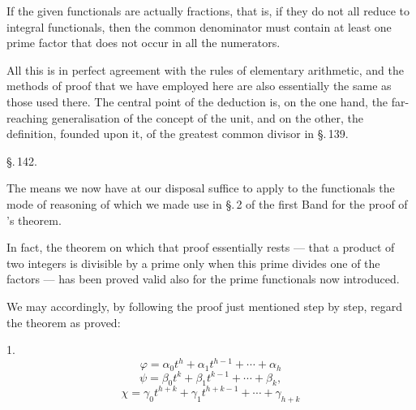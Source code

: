 If the given functionals are actually fractions, that is, if they do not all reduce to integral functionals, then the common denominator must contain at least one prime factor that does not occur in all the numerators.

All this is in perfect agreement with the rules of elementary arithmetic, and the methods of proof that we have employed here are also essentially the same as those used there. The central point of the deduction is, on the one hand, the far-reaching generalisation of the concept of the unit, and on the other, the definition, founded upon it, of the greatest common divisor in \S.\,139.

\begin{center}
\S.\,142.\\
\end{center}

The means we now have at our disposal suffice to apply to the functionals the mode of reasoning of which we made use in \S.\,2 of the first Band for the proof of 's theorem.

In fact, the theorem on which that proof essentially rests --- that a product of two integers is divisible by a prime only when this prime divides one of the factors --- has been proved valid also for the prime functionals now introduced.

We may accordingly, by following the proof just mentioned step by step, regard the theorem as proved:

1. 
\[
\varphi = \alpha_0 t^h + \alpha_1 t^{h-1} + \cdots + \alpha_h
\]
\[
\psi = \beta_0 t^k + \beta_1 t^{k-1} + \cdots + \beta_k,
\]
\[
\chi = \gamma_0 t^{h+k} + \gamma_1 t^{h+k-1} + \cdots + \gamma_{h+k}
\]
